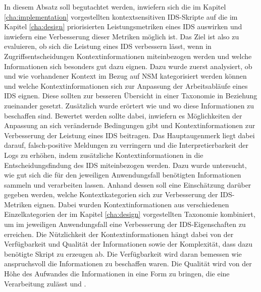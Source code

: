 In diesem Absatz soll begutachtet werden, inwiefern sich die im Kapitel \ref{cha:implementation} vorgestellten kontextsensitiven IDS-Skripte auf die im Kapitel \ref{cha:design} priorisierten Leistungsmetriken eines IDS auswirken und inwiefern eine Verbesserung dieser Metriken möglich ist. Das Ziel ist also zu evaluieren, ob sich die Leistung eines IDS verbessern lässt, wenn in Zugriffsentscheidungen Kontextinformationen miteinbezogen werden und welche Informationen sich besonders gut dazu eignen.
Dazu wurde zuerst analysiert, ob und wie vorhandener Kontext im Bezug auf NSM kategorisiert werden können und welche Kontextinformationen sich zur Anpassung der Arbeitsabläufe eines IDS eignen. Diese sollten zur besseren Übersicht in einer Taxonomie in Beziehung zueinander gesetzt. Zusätzlich wurde erörtert wie und wo diese Informationen zu beschaffen sind. Bewertet werden sollte dabei, inwiefern es Möglichkeiten der Anpassung an sich verändernde Bedingungen gibt und Kontextinformationen zur Verbesserung der Leistung eines IDS beitragen.
Das Hauptaugenmerk liegt dabei darauf, falsch-positive Meldungen zu verringern und die Interpretierbarkeit der Logs zu erhöhen, indem zusätzliche Kontextinformationen in die Entscheidungsfindung des IDS miteinbezogen werden. Dazu wurde untersucht, wie gut sich die für den jeweiligen Anwendungsfall benötigten Informationen sammeln und verarbeiten lassen. Anhand dessen soll eine Einschätzung darüber gegeben werden, welche Kontextkategorien sich zur Verbesserung der IDS-Metriken eignen.
Dabei wurden Kontextinformationen aus verschiedenen Einzelkategorien der im Kapitel \ref{cha:design} vorgestellten Taxonomie kombiniert, um im jeweiligen Anwendungsfall eine Verbesserung der IDS-Eigenschaften zu erreichen.
Die Nützlichkeit der Kontextinformationen hängt dabei von der Verfügbarkeit und Qualität der Informationen sowie der Komplexität, dass dazu benötigte Skript zu erzeugen ab. 
Die Verfügbarkeit wird daran bemessen wie anspruchsvoll die Informationen zu beschaffen waren. Die Qualität wird von der Höhe des Aufwandes die Informationen in eine Form zu bringen, die eine Verarbeitung zulässt und .




